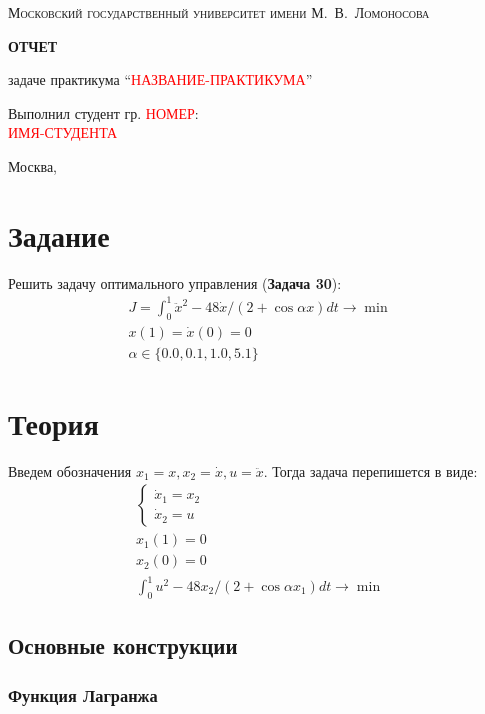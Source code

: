 \documentclass[a4paper,12pt]{article}
\newcommand{\UpdateMe}[1]{\textcolor{red}{#1}}
\newcommand{\University}{Московский государственный университет имени М.~В.~Ломоносова}
\newcommand{\Department}{Кафедра \UpdateMe{НАЗВАНИЕ-КАФЕДРЫ}}
\newcommand{\Student}{\UpdateMe{ИМЯ-СТУДЕНТА}}
\newcommand{\GroupNum}{\UpdateMe{НОМЕР}}
\newcommand{\Seminar}{\UpdateMe{НАЗВАНИЕ-ПРАКТИКУМА}}
\begin{document}
\begin{titlepage}
    \centering
    {\scshape\Large \University\par}\vspace{1cm}{\scshape\large \Department\par}
    \vfill
    {\huge\bfseries ОТЧЕТ\par}{ задаче практикума \enquote{\Seminar}\par}
    \vfill
    \hfill\begin{minipage}{0.45\linewidth}Выполнил студент гр. \GroupNum:\\\Student\end{minipage}
    \vfill
    {\large Москва, \the\year{}\par}
\end{titlepage}

\section*{Задание}
Решить задачу оптимального управления ({\bfseries Задача 30}):
\begin{gather*}
  J = \int_0^1 \ddot{x}^2-48\dot{x}/\left(2+\cos{\alpha x}\right)dt \rightarrow \min\\
  x(1)=\dot{x}(0)=0\\
  \alpha\in\{0.0, 0.1, 1.0, 5.1\}
\end{gather*}

\section*{Теория}

Введем обозначения \(x_1=x, x_2=\dot{x}, u=\ddot{x}\). Тогда задача
перепишется в виде:
\begin{gather*}
  \begin{cases}\dot{x}_1=x_2\\ \dot{x}_2=u \end{cases}\\
  x_1(1)=0\\
  x_2(0)=0\\
  \int_0^1 u^2-48x_2/\left(2+\cos{\alpha x_1}\right)dt \rightarrow \min
\end{gather*}

\subsection*{Основные конструкции}

\subsubsection*{Функция Лагранжа}
\end{document}
